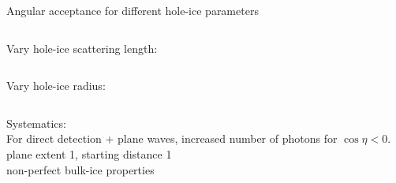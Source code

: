 
\begin{frame}[fragile]{Angular acceptance for different hole-ice parameters}
  \begin{column}{0.5\textwidth}
    Vary hole-ice scattering length: \medskip

  \end{column}
  \begin{column}{0.5\textwidth}
    Vary hole-ice radius: \medskip

  \end{column}

  Systematics: \\
  For direct detection + plane waves, increased number of photons for $\cos \eta < 0$. \\
  plane extent 1\m, starting distance 1\m \\
  non-perfect bulk-ice properties

\end{frame}

